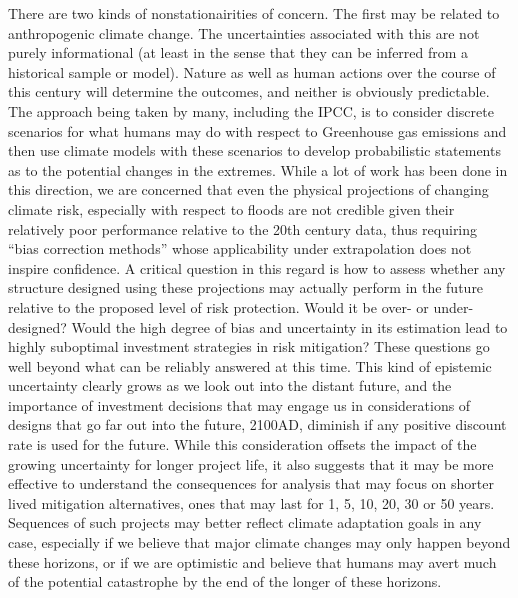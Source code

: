 \documentclass[11pt]{article}
\begin{document}
There are two kinds of nonstationairities of concern.
The first may be related to anthropogenic climate change.
The uncertainties associated with this are not purely informational (at least in the sense that they can be inferred from a historical sample or model).
Nature as well as human actions over the course of this century will determine the outcomes, and neither is obviously predictable. 
The approach being taken by many, including the IPCC, is to consider discrete scenarios for what humans may do with respect to Greenhouse gas emissions and then use climate models with these scenarios to develop probabilistic statements as to the potential changes in the extremes. 
While a lot of work has been done in this direction, we are concerned that even the physical projections of changing climate risk, especially with respect to floods are not credible given their relatively poor performance relative to the 20th century data, thus requiring ``bias correction methods'' whose applicability under extrapolation does not inspire confidence.
A critical question in this regard is how to assess whether any structure designed using these projections may actually perform in the future relative to the proposed level of risk protection.
Would it be over- or under- designed?
Would the high degree of bias and uncertainty in its estimation lead to highly suboptimal investment strategies in risk mitigation?
These questions go well beyond what can be reliably answered at this time. 
This kind of epistemic uncertainty clearly grows as we look out into the distant future, and the importance of investment decisions that may engage us in considerations of designs that go far out into the future, \eg{} 2100AD, diminish if any positive discount rate is used for the future. 
While this consideration offsets the impact of the growing uncertainty for longer project life, it also suggests that it may be more effective to understand the consequences for analysis that may focus on shorter lived mitigation alternatives, ones that may last for 1, 5, 10, 20,  30 or 50 years. 
Sequences of such projects may better reflect climate adaptation goals in any case, especially if we believe that major climate changes may only happen beyond these horizons, or if we are optimistic and believe that humans may avert much of the potential catastrophe by the end of the longer of these horizons.
\end{document}
